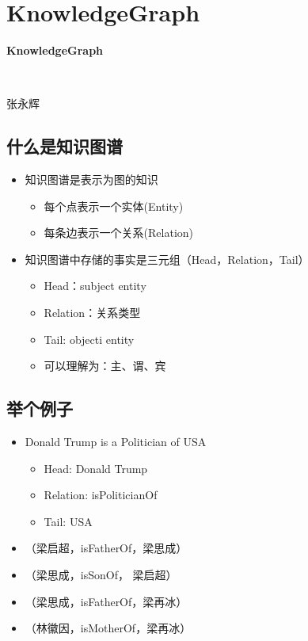 \section*{KnowledgeGraph}

\begin{frame}
\centerline{\textbf{\Large{KnowledgeGraph}}} 
~\\
\centerline{\large{张永辉}}
\end{frame}

\subsection*{什么是知识图谱}
\begin{frame}
	\begin{itemize}
		\item 知识图谱是表示为图的知识 
			\begin{itemize} 
				\item 每个点表示一个实体(Entity)
				\item 每条边表示一个关系(Relation)
			\end{itemize}
		
		\item 知识图谱中存储的事实是三元组（Head，Relation，Tail）
			\begin{itemize} 
				\item Head：subject entity
				\item Relation：关系类型
				\item Tail: objecti entity
				\item 可以理解为：主、谓、宾
			\end{itemize}
	\end{itemize}
\end{frame}

\subsection*{举个例子}
\begin{frame}
	\begin{itemize}

		\item Donald Trump is a Politician of USA
			\begin{itemize} 
				\item Head: Donald Trump
				\item Relation: isPoliticianOf
				\item Tail: USA
			\end{itemize}
		\item （梁启超，isFatherOf，梁思成）
		\item （梁思成，isSonOf， 梁启超）
		\item （梁思成，isFatherOf，梁再冰）
		\item （林徽因，isMotherOf，梁再冰）
	\end{itemize}
\end{frame}

